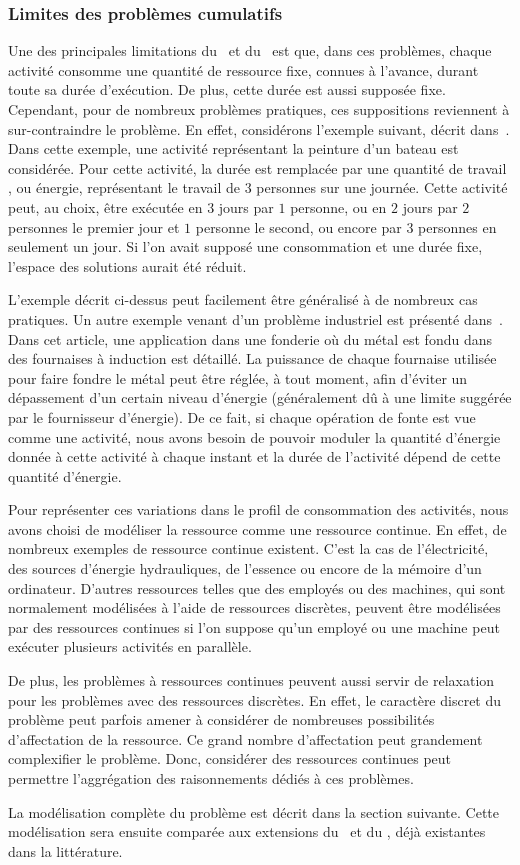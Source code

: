 \subsubsection{Limites des problèmes cumulatifs}
\label{sec:limit_CUSP}
Une des principales limitations du \CUSP~et du \RCPSP~est que, dans
ces problèmes, chaque activité consomme une quantité de ressource
fixe, connues à l'avance, durant toute sa durée d'exécution. De plus,
cette durée est aussi supposée fixe. Cependant, pour de nombreux
problèmes pratiques, ces suppositions reviennent à sur-contraindre le
problème. En effet, considérons l'exemple suivant, décrit
dans~\cite{FT}.  Dans cette exemple, une activité représentant la
peinture d'un bateau est considérée. Pour cette activité, la durée est
remplacée par une quantité de travail , ou énergie, représentant le
travail de $3$ personnes sur une journée. Cette activité peut, au
choix, être exécutée en $3$ jours par $1$ personne, ou en $2$ jours
par $2$ personnes le premier jour et $1$ personne le second, ou encore
par $3$ personnes en seulement un jour. Si l'on avait supposé une
consommation et une durée fixe, l'espace des solutions aurait été
réduit.

L'exemple décrit ci-dessus peut facilement être généralisé à de
nombreux cas pratiques. Un autre exemple venant d'un problème
industriel est présenté dans~\cite{HaitArtiguesLopez}. Dans cet
article, une application dans une fonderie où du métal est fondu dans
des fournaises à induction est détaillé. La puissance de chaque
fournaise utilisée pour faire fondre le métal peut être réglée, à tout
moment, afin d'éviter un dépassement d'un certain niveau d'énergie
(généralement dû à une limite suggérée par le fournisseur
d'énergie). De ce fait, si chaque opération de fonte est vue comme une
activité, nous avons besoin de pouvoir moduler la quantité d'énergie
donnée à cette activité à chaque instant et la durée de l'activité
dépend de cette quantité d'énergie.

Pour représenter ces variations dans le profil de consommation des
activités, nous avons choisi de modéliser la ressource comme une
ressource continue. En effet, de nombreux exemples de ressource
continue existent. C'est la cas de l'électricité, des sources
d'énergie hydrauliques, de l'essence ou encore de la mémoire d'un
ordinateur. D'autres ressources telles que des employés ou des
machines, qui sont normalement modélisées à l'aide de ressources
discrètes, peuvent être modélisées par des ressources continues si
l'on suppose qu'un employé ou une machine peut exécuter plusieurs
activités en parallèle.

De plus, les problèmes à ressources continues peuvent aussi servir de
relaxation pour les problèmes avec des ressources discrètes. En effet,
le caractère discret du problème peut parfois amener à considérer de
nombreuses possibilités d'affectation de la ressource. Ce grand nombre
d'affectation peut grandement complexifier le problème. Donc,
considérer des ressources continues peut permettre l'aggrégation des
raisonnements dédiés à ces problèmes. 

La modélisation complète du problème est décrit dans la section
suivante. Cette modélisation sera ensuite comparée aux extensions du
\CUSP~et du \RCPSP, déjà existantes dans la littérature.

